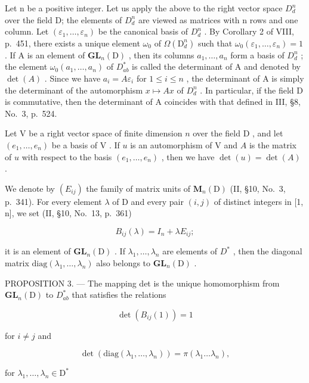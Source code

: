 Let n be a positive integer. Let us apply the above to the right vector space \(D_{d}^{n}\) over the field D; the elements of \(D_{d}^{n}\) are viewed as matrices with n rows and one column. Let \((\varepsilon_{1},\ldots,\varepsilon_{n})\) be the canonical basis of \(D_{d}^{n}\) . By Corollary 2 of VIII, p.~451, there exists a unique element \(\omega_{0}\) of \(\Omega(\mathrm{D}_{d}^{n})\) such that \(\omega_{0}(\varepsilon_{1},\ldots,\varepsilon_{n})=1\) . If A is an element of \(\mathbf{GL}_{n}(\mathrm{D})\) , then its columns \(a_{1},\ldots,a_{n}\) form a basis of \(D_{d}^{n}\) ; the element \(\omega_{0}(a_{1},\ldots,a_{n})\) of \(D_{ab}^{*}\) is called the determinant of A and denoted by \(\det(A)\) . Since we have \(a_{i}=A\varepsilon_{i}\) for \(1\leqslant i\leqslant n\) , the determinant of A is simply the determinant of the automorphism \(x\mapsto Ax\) of \(D_{d}^{n}\) . In particular, if the field D is commutative, then the determinant of A coincides with that defined in III, §8, No.~3, p.~524.

Let \(\mathrm{V}\) be a right vector space of finite dimension \(n\) over the field \(\mathrm{D}\) , and let \((e_1, \ldots, e_n)\) be a basis of \(\mathrm{V}\) . If \(u\) is an automorphism of \(\mathrm{V}\) and \(A\) is the matrix of \(u\) with respect to the basis \((e_1, \ldots, e_n)\) , then we have \(\det(u) = \det(A)\) .

We denote by \((E_{ij})\) the family of matrix units of \(\mathbf{M}_{n}(\mathrm{D})\) (II, §10, No.~3, p.~341). For every element \(\lambda\) of D and every pair \((i,j)\) of distinct integers in {[}1, n{]}, we set (II, §10, No.~13, p.~361)

\[
B _ {i j} (\lambda) = I _ {n} + \lambda E _ {i j};
\]

it is an element of \(\mathbf{GL}_{n}(\mathrm{D})\) . If \(\lambda_{1},\ldots,\lambda_{n}\) are elements of \(D^{*}\) , then the diagonal matrix \(\mathrm{diag}(\lambda_{1},\ldots,\lambda_{n})\) also belongs to \(\mathbf{GL}_{n}(\mathrm{D})\) .

PROPOSITION 3. --- The mapping det is the unique homomorphism from \(\mathbf{GL}_{n}(\mathrm{D})\) to \(D_{ab}^{*}\) that satisfies the relations

\[
\det (B _ {i j} (1)) = 1\tag{16}
\]

for \(i\neq j\) and

\[
\det (\mathrm{diag} (\lambda_ {1}, \ldots , \lambda_ {n})) = \pi (\lambda_ {1} \dots \lambda_ {n}),\tag{17}
\]

for \(\lambda_1, \ldots, \lambda_n \in \mathrm{D}^*\)

